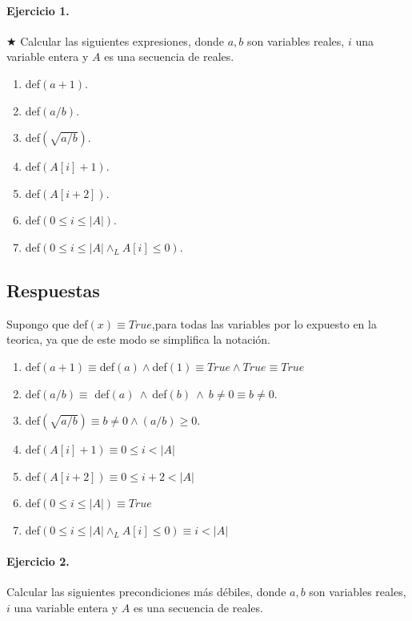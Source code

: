 \documentclass{article}
\begin{document}

\paragraph{Ejercicio 1.} $\bigstar$ Calcular las siguientes expresiones, donde $a, b$ son variables 
reales, $i$ una variable entera y $A$ es una secuencia
de reales.

\begin{enumerate}[label=\alph*)]
\item def$(a + 1).$
\item def$(a/b).$
\item def$( \sqrt{a/b}).$
\item def$(A[i] + 1).$
\item def$(A[i + 2]).$
\item def$(0 \leq i \leq |A|).$
\item def$(0 \leq i \leq |A| \wedge_L A[i] \leq 0).$
\end{enumerate}

\subsection*{Respuestas}
Supongo que def$(x)\equiv True$,para todas las variables por lo expuesto en la teorica,
ya que de este modo se simplifica la notación.

\begin{enumerate}[label=\alph*)]
  \item def$(a + 1)\equiv$def$(a)\wedge$def$(1)\equiv True\wedge True\equiv True$
  \item def$(a/b)\equiv$ def$(a)\ \wedge \ $def$(b)\ \wedge \ b\neq 0\equiv b\neq 0$.
  \item def$( \sqrt{a/b})\equiv b\neq 0\wedge (a/b)\geq 0$.
  \item def$(A[i] + 1)\equiv 0\leq i < |A|$
  \item def$(A[i + 2])\equiv 0\leq i+2 < |A|$
  \item def$(0 \leq i \leq |A|)\equiv True$
  \item def$(0 \leq i \leq |A| \wedge_L A[i] \leq 0)\equiv i<|A|$
\end{enumerate}

\paragraph{Ejercicio 2.} Calcular las siguientes precondiciones más débiles, donde 
$a, b$ son variables reales, $i$ una variable entera y $A$ es
una secuencia de reales.
\end{document}
